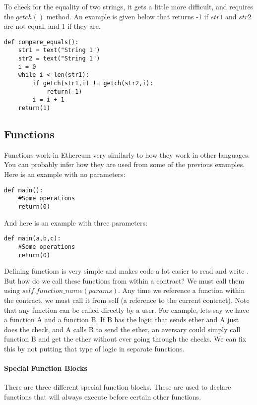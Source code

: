 \documentclass[12pt]{article}
\begin{document}
To check for the equality of two strings, it gets a little more difficult, and requires the $getch()$ method. An example is given below that returns -1 if $str1$ and $str2$ are not equal, and 1 if they are.

\begin{verbatim}
def compare_equals():
	str1 = text("String 1")
	str2 = text("String 1")
	i = 0
	while i < len(str1):
		if getch(str1,i) != getch(str2,i):
			return(-1)
		i = i + 1
	return(1)
\end{verbatim}
	
\subsection{Functions}
Functions work in Ethereum very similarly to how they work in other languages. You can probably infer how they are used from some of the previous examples. Here is an example with no parameters:

\begin{verbatim}
def main():
	#Some operations
	return(0)
\end{verbatim}

And here is an example with three parameters:

\begin{verbatim}
def main(a,b,c):
	#Some operations
	return(0)
\end{verbatim}

Defining functions is very simple and makes code a lot easier to read and write \cite{Serpent}. But how do we call these functions from within a contract? We must call them using $self.function\_name(params)$. Any time we reference a function within the contract, we must call it from self (a reference to the current contract). Note that any function can be called directly by a user. For example, lets say we have a function A and a function B. If B has the logic that sends ether and A just does the check, and A calls B to send the ether, an aversary could simply call function B and get the ether without ever going through the checks. We can fix this by not putting that type of logic in separate functions.

\paragraph{Special Function Blocks}
There are three different special function blocks. These are used to declare functions that will always execute before certain other functions.
\end{document}
